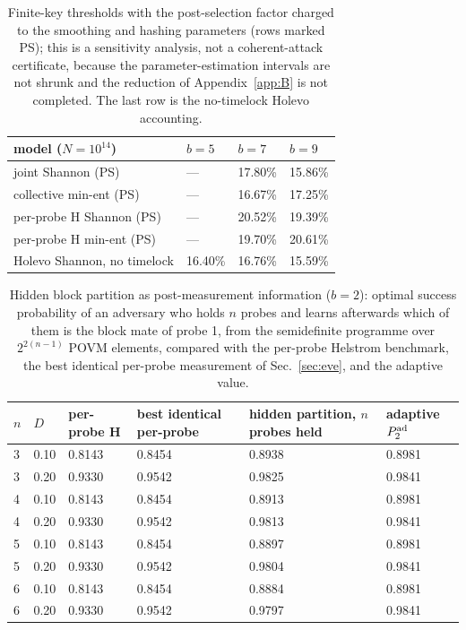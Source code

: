 \documentclass[aps,pra,twocolumn,superscriptaddress,nofootinbib]{revtex4-2}
\begin{document}
\begin{table}[t]\centering\caption{Finite-key thresholds with the post-selection factor charged to the smoothing and hashing parameters (rows marked PS); this is a sensitivity analysis, not a coherent-attack certificate, because the parameter-estimation intervals are not shrunk and the reduction of Appendix~\ref{app:B} is not completed. The last row is the no-timelock Holevo accounting.}\label{tab:ps}
\begin{tabular}{llll}\toprule
model ($N=10^{14}$) & $b=5$ & $b=7$ & $b=9$\\\midrule
joint Shannon (PS) & — & 17.80\% & 15.86\%\\
collective min-ent (PS) & — & 16.67\% & 17.25\%\\
per-probe H Shannon (PS) & — & 20.52\% & 19.39\%\\
per-probe H min-ent (PS) & — & 19.70\% & 20.61\%\\
Holevo Shannon, no timelock & 16.40\% & 16.76\% & 15.59\%\\\bottomrule\end{tabular}\end{table}
\begin{table}[t]\centering\caption{Hidden block partition as post-measurement information ($b=2$): optimal success probability of an adversary who holds $n$ probes and learns afterwards which of them is the block mate of probe 1, from the semidefinite programme over $2^{2(n-1)}$ POVM elements, compared with the per-probe Helstrom benchmark, the best identical per-probe measurement of Sec.~\ref{sec:eve}, and the adaptive value.}\label{tab:hp}
\begin{tabular}{llllll}\toprule
$n$ & $D$ & per-probe H & best identical per-probe & hidden partition, $n$ probes held & adaptive $P^{\rm ad}_2$\\\midrule
3 & 0.10 & 0.8143 & 0.8454 & 0.8938 & 0.8981\\
3 & 0.20 & 0.9330 & 0.9542 & 0.9825 & 0.9841\\
4 & 0.10 & 0.8143 & 0.8454 & 0.8913 & 0.8981\\
4 & 0.20 & 0.9330 & 0.9542 & 0.9813 & 0.9841\\
5 & 0.10 & 0.8143 & 0.8454 & 0.8897 & 0.8981\\
5 & 0.20 & 0.9330 & 0.9542 & 0.9804 & 0.9841\\
6 & 0.10 & 0.8143 & 0.8454 & 0.8884 & 0.8981\\
6 & 0.20 & 0.9330 & 0.9542 & 0.9797 & 0.9841\\\bottomrule\end{tabular}\end{table}
\end{document}
